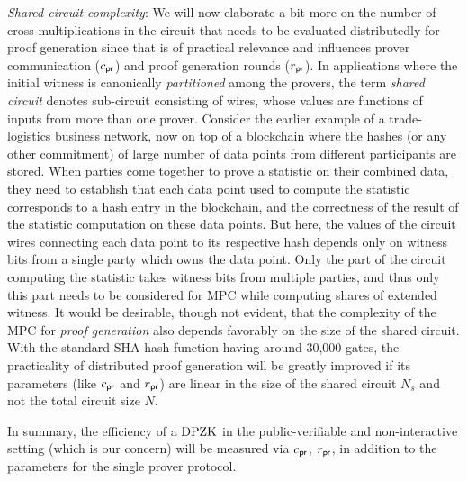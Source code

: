 \noindent\textit{Shared circuit complexity}:
We will now elaborate a bit more on the number of cross-multiplications in the circuit that needs to be evaluated distributedly for proof generation since
that is of practical relevance and influences prover communication ($c_\mathsf{pr}$)
and proof generation rounds ($r_\mathsf{pr}$). In applications where the initial
witness is canonically \textit{partitioned} among the provers, the term
\textit{shared circuit} denotes sub-circuit consisting of wires, whose 
values are functions of inputs from more than one prover. 
Consider the earlier example of a trade-logistics business network, now on top of 
a blockchain where the hashes (or any other commitment) of large number of data points
from different participants are stored. 
When parties come together to prove a statistic on their combined data, they
need to establish that each data point used to compute the statistic corresponds to a 
hash entry in the blockchain, and the correctness of the result of the statistic
computation on these data points. But here, the values of the circuit wires
connecting each data point to its respective hash depends only on witness bits from a 
single party which owns the data point. Only the part of the circuit computing the 
statistic takes witness bits from multiple parties, and thus only this part
needs to be considered for MPC while computing shares of extended witness. It
would be desirable, though not evident, that the complexity of the MPC for {\em proof
generation} also depends favorably on the size of the shared circuit. 
With the standard SHA hash function having around 30,000 gates, the practicality of 
distributed proof generation will be
greatly improved if its parameters (like $c_\mathsf{pr}$ and $r_\mathsf{pr}$) are 
linear in the size of the shared circuit $N_s$ and not the total circuit size $N$.

In summary, the efficiency of a $\text{DPZK}$ in the public-verifiable and
non-interactive setting (which is our concern) will be measured via $c_\mathsf{pr}$,
$r_\mathsf{pr}$, in addition to the parameters for the single prover protocol.

